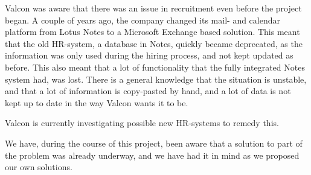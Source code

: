Valcon was aware that there was an issue in recruitment even before the project began.
A couple of years ago, the company changed its mail- and calendar platform from Lotus Notes to a Microsoft Exchange based solution. This meant that the old HR-system, a database in Notes, quickly became deprecated, as the information was only used during the hiring process, and not kept updated as before. This also meant that a lot of functionality that the fully integrated Notes system had, was lost.
There is a general knowledge that the situation is unstable, and that a lot of information is copy-pasted by hand, and a lot of data is not kept up to date in the way Valcon wants it to be.

Valcon is currently investigating possible new HR-systems to remedy this.

We have, during the course of this project, been aware that a solution to part of the problem was already underway, and we have had it in mind as we proposed our own solutions.